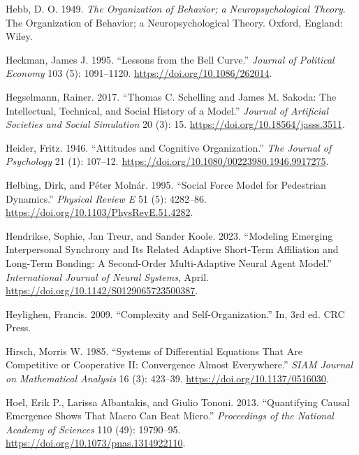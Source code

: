 \documentclass[
  letterpaper,
]{scrbook}
\newlength{\cslhangindent}
\newlength{\cslentryspacingunit} %
\newenvironment{CSLReferences}[2] %
 {%
  \setlength{\parindent}{0pt}
  \ifodd #1
  \let\oldpar\par
  \def\par{\hangindent=\cslhangindent\oldpar}
  \fi
  \setlength{\parskip}{#2\cslentryspacingunit}
 }%
 {}
\begin{document}
\begin{CSLReferences}{1}{0}
\leavevmode{}%
Hebb, D. O. 1949. \emph{The Organization of Behavior; a
Neuropsychological Theory}. The Organization of Behavior; a
Neuropsychological Theory. {Oxford, England}: {Wiley}.

\leavevmode{}%
Heckman, James J. 1995. {``Lessons from the {Bell Curve}.''}
\emph{Journal of Political Economy} 103 (5): 1091--1120.
\url{https://doi.org/10.1086/262014}.

\leavevmode{}%
Hegselmann, Rainer. 2017. {``Thomas {C}. {Schelling} and {James M}.
{Sakoda}: {The Intellectual}, {Technical}, and {Social History} of a
{Model}.''} \emph{Journal of Artificial Societies and Social Simulation}
20 (3): 15. \url{https://doi.org/10.18564/jasss.3511}.

\leavevmode{}%
Heider, Fritz. 1946. {``Attitudes and {Cognitive Organization}.''}
\emph{The Journal of Psychology} 21 (1): 107--12.
\url{https://doi.org/10.1080/00223980.1946.9917275}.

\leavevmode{}%
Helbing, Dirk, and Péter Molnár. 1995. {``Social Force Model for
Pedestrian Dynamics.''} \emph{Physical Review E} 51 (5): 4282--86.
\url{https://doi.org/10.1103/PhysRevE.51.4282}.

\leavevmode{}%
Hendrikse, Sophie, Jan Treur, and Sander Koole. 2023. {``Modeling
{Emerging Interpersonal Synchrony} and Its {Related Adaptive Short-Term
Affiliation} and {Long-Term Bonding}: {A Second-Order Multi-Adaptive
Neural Agent Model}.''} \emph{International Journal of Neural Systems},
April. \url{https://doi.org/10.1142/S0129065723500387}.

\leavevmode{}%
Heylighen, Francis. 2009. {``Complexity and Self-Organization.''} In,
3rd ed. CRC Press.

\leavevmode{}%
Hirsch, Morris W. 1985. {``Systems of {Differential Equations} That Are
{Competitive} or {Cooperative II}: {Convergence Almost Everywhere}.''}
\emph{SIAM Journal on Mathematical Analysis} 16 (3): 423--39.
\url{https://doi.org/10.1137/0516030}.

\leavevmode{}%
Hoel, Erik P., Larissa Albantakis, and Giulio Tononi. 2013.
{``Quantifying Causal Emergence Shows That Macro Can Beat Micro.''}
\emph{Proceedings of the National Academy of Sciences} 110 (49):
19790--95. \url{https://doi.org/10.1073/pnas.1314922110}.


\end{CSLReferences}
\end{document}
